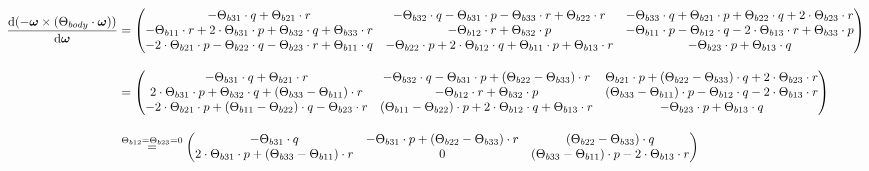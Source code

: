 \begin{align*}
	\frac{\text{d}(-\boldsymbol{\omega} \times (\Theta_{body}\cdot\boldsymbol{\omega}))}{\text{d}\boldsymbol{\omega}} &= 
	\begin{pmatrix}
		-\Theta_{b31} \cdot q + \Theta_{b21}\cdot r & 
		-\Theta_{b32} \cdot q -\Theta_{b31} \cdot p - \Theta_{b33}\cdot r + \Theta_{b22}\cdot r & 
		-\Theta_{b33}\cdot q + \Theta_{b21}\cdot p + \Theta_{b22}\cdot q + 2\cdot \Theta_{b23}\cdot r
		\\
		-\Theta_{b11} \cdot r + 2\cdot \Theta_{b31}\cdot p + \Theta_{b32}\cdot q +\Theta_{b33}\cdot r& 
		-\Theta_{b12} \cdot r +\Theta_{b32} \cdot p & 
		-\Theta_{b11}\cdot p - \Theta_{b12}\cdot q - 2\cdot\Theta_{b13}\cdot r + \Theta_{b33}\cdot p
		\\
		-2\cdot \Theta_{b21} \cdot p - \Theta_{b22}\cdot q - \Theta_{b23}\cdot r +\Theta_{b11}\cdot q &  
		-\Theta_{b22}\cdot p + 2\cdot \Theta_{b12}\cdot q + \Theta_{b11}\cdot p + \Theta_{b13}\cdot r &
		-\Theta_{b23} \cdot p +\Theta_{b13} \cdot q
	\end{pmatrix}
	\\[1em]
	&= \begin{pmatrix}
		-\Theta_{b31} \cdot q + \Theta_{b21}\cdot r & 
		-\Theta_{b32} \cdot q -\Theta_{b31} \cdot p + (\Theta_{b22} - \Theta_{b33})\cdot r  & 
		\Theta_{b21}\cdot p + (\Theta_{b22}-\Theta_{b33})\cdot q + 2\cdot \Theta_{b23}\cdot r
	\\
		2\cdot \Theta_{b31}\cdot p + \Theta_{b32}\cdot q + (\Theta_{b33}-\Theta_{b11})\cdot r & 
		-\Theta_{b12} \cdot r +\Theta_{b32} \cdot p & 
		(\Theta_{b33}-\Theta_{b11})\cdot p - \Theta_{b12}\cdot q - 2\cdot\Theta_{b13}\cdot r 
	\\
		-2\cdot \Theta_{b21} \cdot p + (\Theta_{b11}- \Theta_{b22})\cdot q - \Theta_{b23}\cdot r &  
		(\Theta_{b11}-\Theta_{b22})\cdot p + 2\cdot \Theta_{b12}\cdot q + \Theta_{b13}\cdot r &
		-\Theta_{b23} \cdot p +\Theta_{b13} \cdot q
	\end{pmatrix}
	\\[1em]
	&\overset{\Theta_{b12}=\Theta_{b23}=0}{=} 
	\begin{pmatrix}
		-\Theta_{b31} \cdot q  & 
		-\Theta_{b31} \cdot p + (\Theta_{b22} - \Theta_{b33})\cdot r  & 
	 	(\Theta_{b22}-\Theta_{b33})\cdot q 
	\\
		2\cdot \Theta_{b31}\cdot p + (\Theta_{b33}-\Theta_{b11})\cdot r & 
		0 & 
		(\Theta_{b33}-\Theta_{b11})\cdot p  - 2\cdot\Theta_{b13}\cdot r 

\end{pmatrix}
\end{align*}
